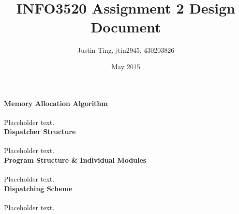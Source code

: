 \documentclass[12pt]{article}
\title{INFO3520 Assignment 2 Design Document}
\author{Justin Ting, jtin2945, 430203826}
\date{May 2015}
\begin{document}
\maketitle

\textbf{Memory Allocation Algorithm}\\\\
Placeholder text.\\

\textbf{Dispatcher Structure}\\\\
Placeholder text.\\

\textbf{Program Structure \& Individual Modules}\\\\
Placeholder text.\\

\textbf{Dispatching Scheme}\\\\
Placeholder text.\\
\end{document}
